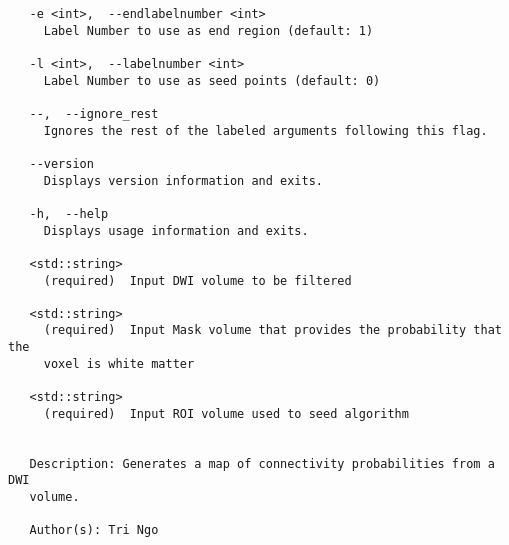 \begin{verbatim}
   -e <int>,  --endlabelnumber <int>
     Label Number to use as end region (default: 1)

   -l <int>,  --labelnumber <int>
     Label Number to use as seed points (default: 0)

   --,  --ignore_rest
     Ignores the rest of the labeled arguments following this flag.

   --version
     Displays version information and exits.

   -h,  --help
     Displays usage information and exits.

   <std::string>
     (required)  Input DWI volume to be filtered

   <std::string>
     (required)  Input Mask volume that provides the probability that the
     voxel is white matter

   <std::string>
     (required)  Input ROI volume used to seed algorithm


   Description: Generates a map of connectivity probabilities from a DWI
   volume.

   Author(s): Tri Ngo
\end{verbatim}
